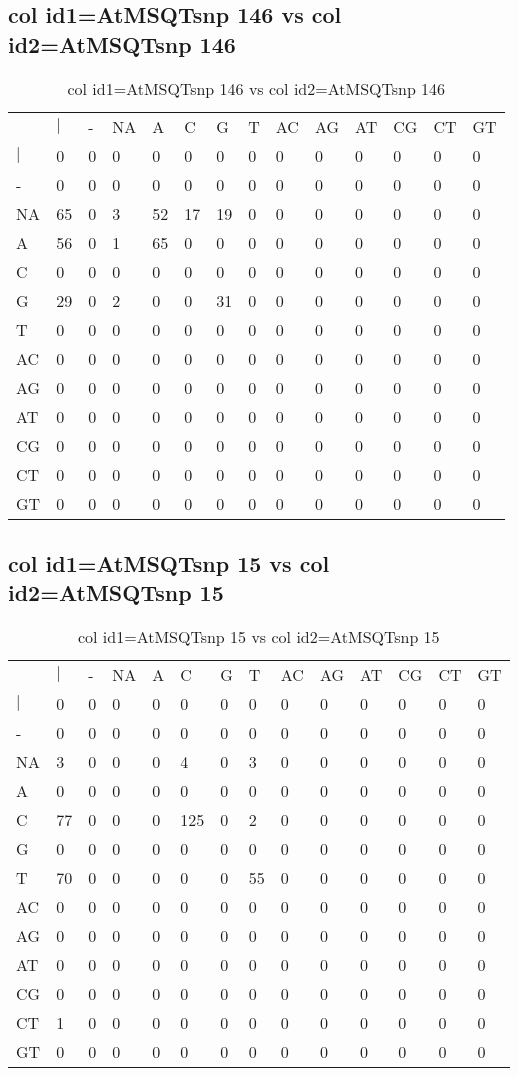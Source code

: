 \subsection{col id1=AtMSQTsnp 146 vs col id2=AtMSQTsnp 146}
\begin{center}
\begin{longtable}{|l|l|l|l|l|l|l|l|l|l|l|l|l|l|}
\caption{col id1=AtMSQTsnp 146 vs col id2=AtMSQTsnp 146} \label{table_dm724}\\
\hline
\\
\hline
&$|$&-&NA&A&C&G&T&AC&AG&AT&CG&CT&GT\\
$|$&0&0&0&0&0&0&0&0&0&0&0&0&0\\
-&0&0&0&0&0&0&0&0&0&0&0&0&0\\
NA&65&0&3&52&17&19&0&0&0&0&0&0&0\\
A&56&0&1&65&0&0&0&0&0&0&0&0&0\\
C&0&0&0&0&0&0&0&0&0&0&0&0&0\\
G&29&0&2&0&0&31&0&0&0&0&0&0&0\\
T&0&0&0&0&0&0&0&0&0&0&0&0&0\\
AC&0&0&0&0&0&0&0&0&0&0&0&0&0\\
AG&0&0&0&0&0&0&0&0&0&0&0&0&0\\
AT&0&0&0&0&0&0&0&0&0&0&0&0&0\\
CG&0&0&0&0&0&0&0&0&0&0&0&0&0\\
CT&0&0&0&0&0&0&0&0&0&0&0&0&0\\
GT&0&0&0&0&0&0&0&0&0&0&0&0&0\\
\hline
\end{longtable}
\end{center}

\subsection{col id1=AtMSQTsnp 15 vs col id2=AtMSQTsnp 15}
\begin{center}
\begin{longtable}{|l|l|l|l|l|l|l|l|l|l|l|l|l|l|}
\caption{col id1=AtMSQTsnp 15 vs col id2=AtMSQTsnp 15} \label{table_dm726}\\
\hline
\\
\hline
&$|$&-&NA&A&C&G&T&AC&AG&AT&CG&CT&GT\\
$|$&0&0&0&0&0&0&0&0&0&0&0&0&0\\
-&0&0&0&0&0&0&0&0&0&0&0&0&0\\
NA&3&0&0&0&4&0&3&0&0&0&0&0&0\\
A&0&0&0&0&0&0&0&0&0&0&0&0&0\\
C&77&0&0&0&125&0&2&0&0&0&0&0&0\\
G&0&0&0&0&0&0&0&0&0&0&0&0&0\\
T&70&0&0&0&0&0&55&0&0&0&0&0&0\\
AC&0&0&0&0&0&0&0&0&0&0&0&0&0\\
AG&0&0&0&0&0&0&0&0&0&0&0&0&0\\
AT&0&0&0&0&0&0&0&0&0&0&0&0&0\\
CG&0&0&0&0&0&0&0&0&0&0&0&0&0\\
CT&1&0&0&0&0&0&0&0&0&0&0&0&0\\
GT&0&0&0&0&0&0&0&0&0&0&0&0&0\\
\hline
\end{longtable}
\end{center}

